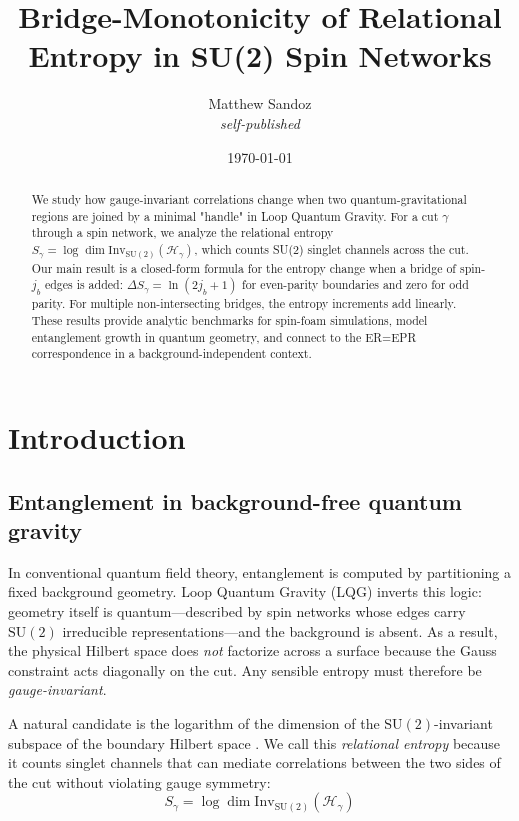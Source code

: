 \documentclass[11pt, a4paper]{article}
\title{Bridge-Monotonicity of Relational Entropy in SU(2) Spin Networks}
\author{Matthew Sandoz\\ \textit{self-published}}
\date{\today}
\theoremstyle{plain}
\theoremstyle{definition}
\theoremstyle{remark}
\newcommand{\Hil}{\mathcal{H}}
\newcommand{\Inv}{\mathrm{Inv}}
\newcommand{\SU}{\mathrm{SU}}
\begin{document}
\begin{abstract}
We study how gauge-invariant correlations change when two quantum-gravitational regions are joined by a minimal "handle" in Loop Quantum Gravity. For a cut $\gamma$ through a spin network, we analyze the relational entropy $S_{\gamma} = \log\dim\Inv_{\SU(2)}(\Hil_{\gamma})$, which counts SU(2) singlet channels across the cut. Our main result is a closed-form formula for the entropy change when a bridge of spin-$j_b$ edges is added: $\Delta S_{\gamma} = \ln(2j_b+1)$ for even-parity boundaries and zero for odd parity. For multiple non-intersecting bridges, the entropy increments add linearly. These results provide analytic benchmarks for spin-foam simulations, model entanglement growth in quantum geometry, and connect to the ER=EPR correspondence in a background-independent context.
\end{abstract}

\maketitle

\section{Introduction}
\label{sec:intro}

\subsection{Entanglement in background-free quantum gravity}

In conventional quantum field theory, entanglement is computed by partitioning a fixed background geometry. Loop Quantum Gravity (LQG) inverts this logic: geometry itself is quantum—described by spin networks whose edges carry $\SU(2)$ irreducible representations—and the background is absent. As a result, the physical Hilbert space does \emph{not} factorize across a surface because the Gauss constraint acts diagonally on the cut. Any sensible entropy must therefore be \emph{gauge-invariant}.

A natural candidate is the logarithm of the dimension of the $\SU(2)$-invariant subspace of the boundary Hilbert space \cite{DonnellyFreidel2016,DonnellyWall2016}. We call this \emph{relational entropy} because it counts singlet channels that can mediate correlations between the two sides of the cut without violating gauge symmetry:
\begin{equation}
S_{\gamma} = \log\dim\Inv_{\SU(2)}(\Hil_{\gamma})
\end{equation}
\end{document}
